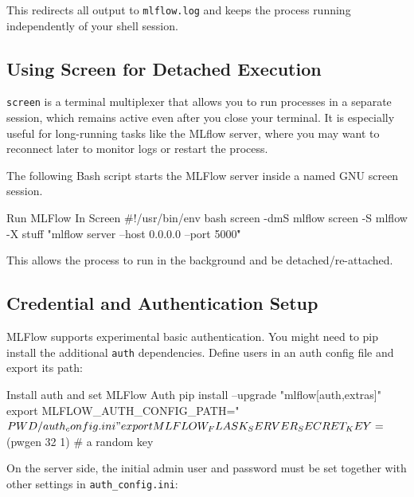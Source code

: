 This redirects all output to \texttt{mlflow.log} and keeps the process running independently of your shell session.


%
\subsection{Using Screen for Detached Execution}

\texttt{screen} is a terminal multiplexer that allows you to run processes in a separate session, which remains active even after you close your terminal. It is especially useful for long-running tasks like the MLflow server, where you may want to reconnect later to monitor logs or restart the process.

The following Bash script starts the MLFlow server inside a named GNU screen session.

\begin{codeonly}{Run MLFlow In Screen}
#!/usr/bin/env bash
screen -dmS mlflow
screen -S mlflow -X stuff "mlflow server --host 0.0.0.0 --port 5000\r"
\end{codeonly}

This allows the process to run in the background and be detached/re-attached.

%
\subsection{Credential and Authentication Setup}

MLFlow supports experimental basic authentication.
You might need to pip install the additional \texttt{auth} dependencies.
Define users in an auth config file and export its path:

\begin{codeonly}{Install auth and set MLFlow Auth}
pip install --upgrade "mlflow[auth,extras]"
export MLFLOW_AUTH_CONFIG_PATH="${PWD}/auth_config.ini"
export MLFLOW_FLASK_SERVER_SECRET_KEY=$(pwgen 32 1) # a random key
\end{codeonly}

On the server side, the initial admin user and password must be set together with other settings in \texttt{auth\_config.ini}:

